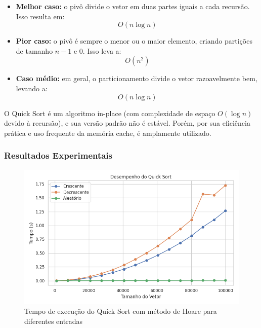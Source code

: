 \begin{itemize}
    \item \textbf{Melhor caso:} o pivô divide o vetor em duas partes iguais a cada recursão. Isso resulta em:
    \[
    O(n \log n)
    \]

    \item \textbf{Pior caso:} o pivô é sempre o menor ou o maior elemento, criando partições de tamanho \(n-1\) e 0. Isso leva a:
    \[
    O(n^2)
    \]

    \item \textbf{Caso médio:} em geral, o particionamento divide o vetor razoavelmente bem, levando a:
    \[
    O(n \log n)
    \]
\end{itemize}

O Quick Sort é um algoritmo in-place (com complexidade de espaço \(O(\log n)\) devido à recursão), e sua versão padrão
não é estável. Porém, por sua eficiência prática e uso frequente da memória cache, é amplamente utilizado.~\cite{geeksforgeeks_quick_sort}

\subsubsection{Resultados Experimentais}
\begin{figure}[H]
    \centering
    \includegraphics[width=1\textwidth]{../codigos/resultados/quick_grafico.png}
    \caption{Tempo de execução do Quick Sort com método de Hoare para diferentes entradas}
    \label{fig:quick_hoare-grafico}
\end{figure}

